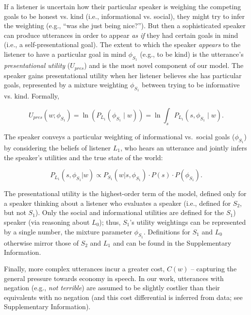 \documentclass[9pt,twocolumn,twoside,lineno]{main_class_file}
\begin{document}
If a listener is uncertain how their particular speaker is weighing the competing goals to be honest vs. kind (i.e., informational vs. social), they might try to infer the weighting (e.g., ``was she just being nice?'').
But then a sophisticated speaker can produce utterances in order to appear \emph{as if} they had certain goals in mind (i.e., a self-presentational goal).
The extent to which the speaker \emph{appears} to the listener to have a particular goal in mind \(\phi_{S_1}\) (e.g., to be kind) is the utterance's \emph{presentational utility} (\(U_{pres}\)) and is the most novel component of our model.
The speaker gains presentational utility when her listener believes she
has particular goals, represented by a mixture weighting \(\phi_{S_1}\) between trying to be informative vs. kind.
Formally,

\begin{equation}
U_{pres}(w; \phi_{S_1}) = \ln(P_{L_1}(\phi_{S_1} \mid w)) = \ln \int_s P_{L_1}(s, \phi_{S_1} \mid w).
\end{equation}

The speaker conveys a particular weighting of informational
vs.~social goals (\(\phi_{S_1}\)) by considering the
beliefs of listener \(L_1\), who hears an utterance and jointly infers
the speaker's utilities and the true state of the world:

\begin{equation}
P_{L_1}(s, \phi_{S_1} | w) \propto P_{S_1}(w | s, \phi_{S_1}) \cdot P(s) \cdot P(\phi_{S_1}).
\end{equation}

The presentational utility is the highest-order term of the model, defined only for a speaker thinking about a listener who evaluates a speaker
(i.e., defined for \(S_2\), but not \(S_1\)).
Only the social and informational utilities are defined for the \(S_1\)) speaker (via reasoning about \(L_0\)); thus, \(S_1\)'s utility weightings can be represented by a single number, the mixture parameter \(\phi_{S_1}\).
Definitions for \(S_1\) and  \(L_0\) otherwise mirror those of  \(S_2\) and  \(L_1\) and can be found in the Supplementary Information.

Finally, more complex utterances incur a greater cost, \(C(w)\) --
capturing the general pressure towards economy in speech. In our work,
utterances with negation (e.g., \emph{not terrible}) are assumed to
be slightly costlier than their equivalents with no negation (and this cost differential is inferred
from data; see Supplementary Information).
\end{document}
